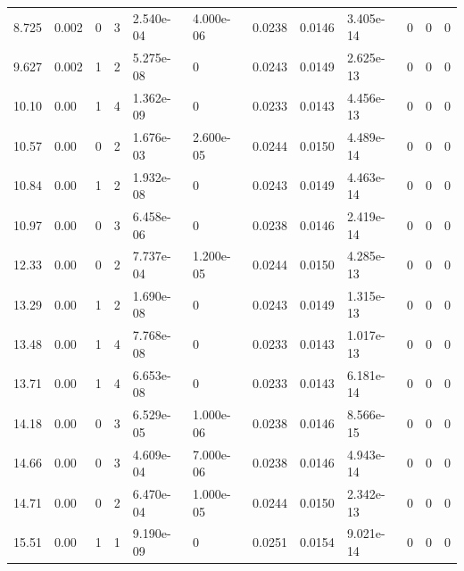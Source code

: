 \documentclass[preview]{standalone}
\begin{document}
{{\begin{tabular}{L{1.2cm}C{1.2cm} C{0.3cm}C{0.5cm} C{1.4cm}C{1.4cm} C{1.4cm}C{1.4cm} C{1.6cm}C{1.6cm} C{1.6cm}C{1.6cm}}
  8.725  &  0.002  & 0     &  3 &  2.540e-04  & 4.000e-06  &  0.0238&   0.0146& 3.405e-14 & 0   &  0 & 0  \\ 
  9.627  &  0.002  & 1     &  2 &  5.275e-08  & 0  &  0.0243&   0.0149& 2.625e-13 & 0   &  0 & 0  \\ 
  10.10  &  0.00  & 1     &  4 &  1.362e-09  & 0  &  0.0233&   0.0143& 4.456e-13 & 0   &  0 & 0  \\ 
  10.57  &  0.00  & 0     &  2 &  1.676e-03  & 2.600e-05  &  0.0244&   0.0150& 4.489e-14 & 0   &  0 & 0  \\ 
  10.84  &  0.00  & 1     &  2 &  1.932e-08  & 0  &  0.0243&   0.0149& 4.463e-14 & 0   &  0 & 0  \\ 
  10.97  &  0.00  & 0     &  3 &  6.458e-06  & 0  &  0.0238&   0.0146& 2.419e-14 & 0   &  0 & 0  \\ 
  12.33  &  0.00  & 0     &  2 &  7.737e-04  & 1.200e-05  &  0.0244&   0.0150& 4.285e-13 & 0   &  0 & 0  \\ 
  13.29  &  0.00  & 1     &  2 &  1.690e-08  & 0  &  0.0243&   0.0149& 1.315e-13 & 0   &  0 & 0  \\ 
  13.48  &  0.00  & 1     &  4 &  7.768e-08  & 0  &  0.0233&   0.0143& 1.017e-13 & 0   &  0 & 0  \\ 
  13.71  &  0.00  & 1     &  4 &  6.653e-08  & 0  &  0.0233&   0.0143& 6.181e-14 & 0   &  0 & 0  \\ 
  14.18  &  0.00  & 0     &  3 &  6.529e-05  & 1.000e-06  &  0.0238&   0.0146& 8.566e-15 & 0   &  0 & 0  \\ 
  14.66  &  0.00  & 0     &  3 &  4.609e-04  & 7.000e-06  &  0.0238&   0.0146& 4.943e-14 & 0   &  0 & 0  \\ 
  14.71  &  0.00  & 0     &  2 &  6.470e-04  & 1.000e-05  &  0.0244&   0.0150& 2.342e-13 & 0   &  0 & 0  \\ 
  15.51  &  0.00  & 1     &  1 &  9.190e-09  & 0  &  0.0251&   0.0154& 9.021e-14 & 0   &  0 & 0  \\ 
\hline 
\end{tabular} 

}}
\end{document}
